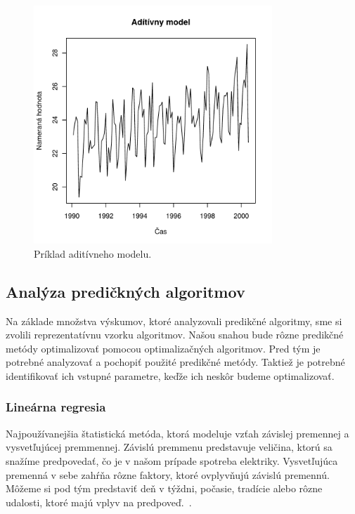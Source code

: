 \documentclass[a4paper,slovak,12pt,appendix]{article}
\begin{document}
\begin{figure}[!ht]
  \centering
  \includegraphics[width=0.8\textwidth]{add_model.pdf}
  \caption{Príklad aditívneho modelu.}
  \label{fig-add-model}
\end{figure}


\subsection{Analýza predičkných algoritmov}
Na základe množstva výskumov, ktoré analyzovali predikčné algoritmy, sme si
zvolili reprezentatívnu vzorku algoritmov. Našou snahou bude rôzne predikčné
metódy optimalizovať pomocou optimalizačných algoritmov. Pred tým je potrebné
analyzovať a pochopiť použité predikčné metódy. Taktiež je potrebné
identifikovať ich vstupné parametre, keďže ich neskôr budeme optimalizovať.


\subsubsection{Lineárna regresia}
Najpoužívanejšia štatistická metóda, ktorá modeluje vzťah závislej premennej
a vysvetľujúcej premmennej. Závislú premmenu predstavuje veličina, ktorú sa
snažíme predpovedať, čo je v našom prípade spotreba elektriky. Vysvetľujúca
premenná v sebe zahŕňa rôzne faktory, ktoré ovplyvňujú závislú premennú.
Môžeme si pod tým predstaviť deň v týždni, počasie, tradície alebo rôzne
udalosti, ktoré majú vplyv na predpoveď.~\cite{KumarSingh2013, Mahalakshmi2016}.
\end{document}
